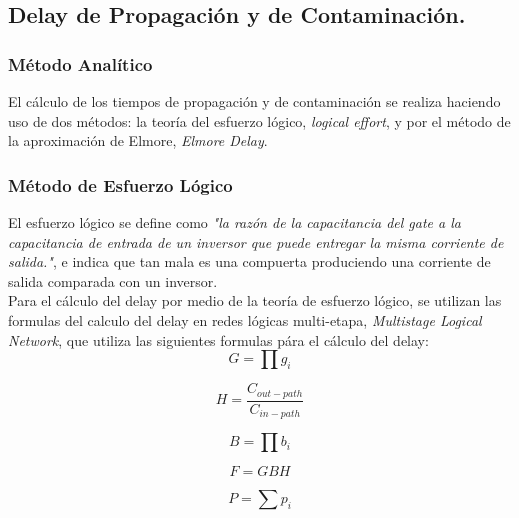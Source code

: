 \documentclass[12pt,a4paper]{article} %
\begin{document}
\subsection{Delay de Propagación y de Contaminación.}

\subsubsection{Método Analítico}

El cálculo de los tiempos de propagación y de contaminación se realiza haciendo uso de dos métodos: la teoría del esfuerzo lógico, \textit{logical effort}, y por el método de la aproximación de Elmore, \textit{Elmore Delay}.\\

\subsubsection{Método de Esfuerzo Lógico}

El esfuerzo lógico se define como \textit{"la razón de la capacitancia del gate a la capacitancia de entrada de un inversor que puede entregar la misma corriente de salida."}, e indica que tan mala es una compuerta produciendo una corriente de salida comparada con un inversor.\\

Para el cálculo del delay por medio de la teoría de esfuerzo lógico, se utilizan las formulas del calculo del delay en redes lógicas multi-etapa, \textit{Multistage Logical Network}, que utiliza las siguientes formulas pára el cálculo del delay:\\

\begin{equation}\label{eqn:esfuerzo_logico}
G= \prod g_{i}
\end{equation}

\begin{equation}\label{eqn:esfuerzo_electrico}
H= \frac{C_{out-path}}{C_{in-path}}
\end{equation}

\begin{equation}\label{eqn:esfuerzo_enramado}
B= \prod b_{i}
\end{equation}

\begin{equation}\label{eqn:esfuerzo}
F = GBH
\end{equation}

\begin{equation}\label{eqn:delay_parasitico}
P = \sum p_{i}
\end{equation}
\end{document}
